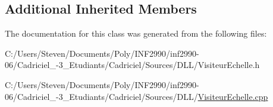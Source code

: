 \subsection*{Additional Inherited Members}


The documentation for this class was generated from the following files\+:\begin{DoxyCompactItemize}
\item 
C\+:/\+Users/\+Steven/\+Documents/\+Poly/\+I\+N\+F2990/inf2990-\/06/\+Cadriciel\+\_-\/3\+\_\+\+Etudiants/\+Cadriciel/\+Sources/\+D\+L\+L/Visiteur\+Echelle.\+h\item 
C\+:/\+Users/\+Steven/\+Documents/\+Poly/\+I\+N\+F2990/inf2990-\/06/\+Cadriciel\+\_-\/3\+\_\+\+Etudiants/\+Cadriciel/\+Sources/\+D\+L\+L/\hyperlink{_visiteur_echelle_8cpp}{Visiteur\+Echelle.\+cpp}\end{DoxyCompactItemize}

